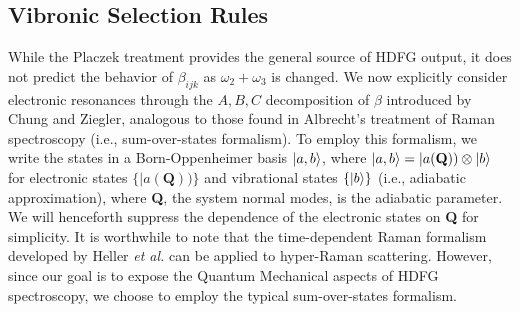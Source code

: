 \documentclass[aip, jcp, reprint, onecolumn, nofootinbib]{revtex4-2}
\begin{document}
\subsection{Vibronic Selection Rules}\label{Albrecht}
While the Placzek treatment provides the general source of HDFG output, it does not predict the behavior of $\beta_{ijk}$ as $\omega_2 + \omega_3$ is changed.
We now explicitly consider electronic resonances through the $A,B,C$ decomposition of $\beta$ introduced by Chung and Ziegler, analogous to those found in Albrecht's treatment of Raman spectroscopy (i.e., sum-over-states formalism).\cite{Albrecht1961, Ziegler1988} 
To employ this formalism, we write the states in a Born-Oppenheimer basis $\ket{a,b}$, where $\ket{a,b} = |a(\textbf{Q})) \otimes \ket{b}$ for electronic states $\{|a(\textbf{Q}))\}$ and vibrational states $\{\ket{b}\}$ (i.e., adiabatic approximation), where \textbf{Q}, the system normal modes, is the adiabatic parameter. \cite{BornOppenheimer, Tang1970}
We will henceforth suppress the dependence of the electronic states on \textbf{Q} for simplicity.
It is worthwhile to note that the time-dependent Raman formalism developed by Heller \textit{et al.} can be applied to hyper-Raman scattering. \cite{Myers1982, Shoute2005}
However, since our goal is to expose the Quantum Mechanical aspects of HDFG spectroscopy, we choose to employ the typical sum-over-states formalism.
\end{document}
